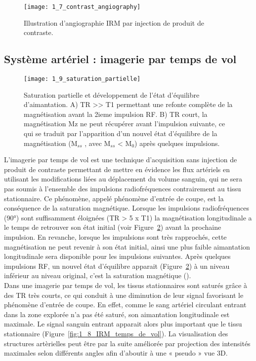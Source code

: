 \begin{figure}[!t]
\centering
\texttt{[image: 1\_7\_contrast\_angiography]}
\caption{Illustration d'angiographie IRM par injection de produit de contraste. }
\label{fig:1_7_contrast_angiography}	
\end{figure}

\subsection{Système artériel : imagerie par temps de vol}
\begin{figure}[!t]
\centering
\texttt{[image: 1\_9\_saturation\_partielle]}
\caption{Saturation partielle et développement de l'état d'équilibre d'aimantation. A) TR >> T1 permettant une refonte complète de la magnétisation avant la 2ieme impulsion RF. B) TR court, la magnétisation Mz ne peut récupérer avant l’impulsion suivante, ce qui se traduit par l’apparition d’un nouvel état d’équilibre de la magnétisation (M$_{ss}$ , avec M$_{ss}$ < M$_{0}$) après quelques impulsions. }
\label{fig:1_9_saturation_partielle}	
\end{figure}
L’imagerie par temps de vol est une technique d’acquisition sans injection de produit de contraste permettant de mettre en évidence les flux artériels en utilisant les modifications liées au déplacement du volume sanguin, qui ne sera pas soumis à l’ensemble des impulsions radiofréquences contrairement au tissu stationnaire. Ce phénomène, appelé phénomène d’entrée de coupe, est la conséquence de la saturation magnétique. Lorsque les impulsions radiofréquences (90°) sont suffisamment éloignées (TR > 5 x T1) la magnétisation longitudinale a le temps de retrouver son état initial (voir Figure~\ref{fig:1_9_saturation_partielle}) avant la prochaine impulsion. En revanche, lorsque les impulsions sont très rapprochés, cette magnétisation ne peut revenir à son état initial, ainsi une plus faible aimantation longitudinale sera disponible pour les impulsions suivantes. Après quelques impulsions RF, un nouvel état d’équilibre apparait (Figure~\ref{fig:1_9_saturation_partielle}) à un niveau inférieur au niveau original, c’est la saturation magnétique (\cite{timeflighteffects}).\\
Dans une imagerie par temps de vol, les tissus stationnaires sont saturés grâce à des TR très courts, ce qui conduit à une diminution de leur signal favorisant le phénomène d’entrée de coupe. En effet, comme le sang artériel circulant entrant dans la zone explorée n’a pas été saturé, son aimantation longitudinale est maximale. Le signal sanguin entrant apparait alors plus important que le tissu stationnaire (Figure~\ref{fig:1_8_IRM_temps_de_vol}). La visualisation des structures artèrielles peut être par la suite améliorée par projection des intensités maximales selon différents angles afin d’aboutir à une « pseudo » vue 3D.\\
